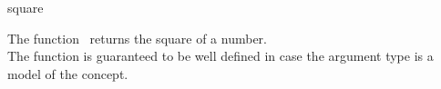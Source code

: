 \begin{ccRefFunction}{square}

\ccDefinition

The function \ccRefName\ returns the square of a number.\\
The function is guaranteed to be well defined in case the argument type 
is a model of the  concept. 


{}

\ccSeeAlso

\\
\\

\end{ccRefFunction}

